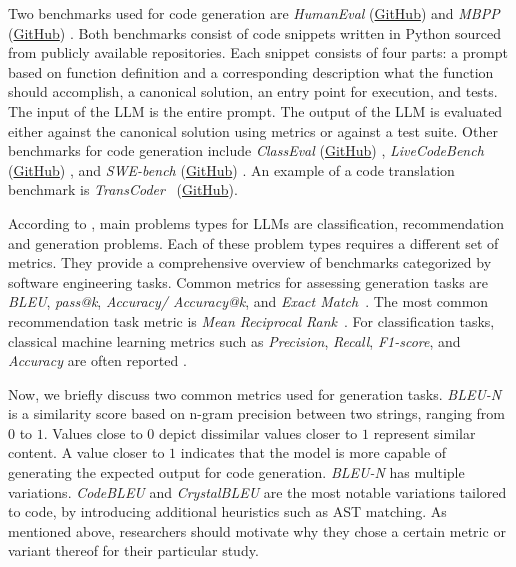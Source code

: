 Two benchmarks used for code generation are \emph{HumanEval} (\href{https://github.com/openai/human-eval}{GitHub}) \cite{DBLP:conf/acl/PapineniRWZ02} and \emph{MBPP} (\href{https://huggingface.co/datasets/google-research-datasets/mbpp}{GitHub}) \cite{DBLP:journals/corr/abs-2108-07732}.
Both benchmarks consist of code snippets written in Python sourced from publicly available repositories.
Each snippet consists of four parts: a prompt based on function definition and a corresponding description what the function should accomplish, a canonical solution, an entry point for execution, and tests.
The input of the LLM is the entire prompt.
The output of the LLM is evaluated either against the canonical solution using metrics or against a test suite.
Other benchmarks for code generation include \emph{ClassEval} (\href{https://github.com/openai/human-eval}{GitHub}) \cite{DBLP:journals/corr/abs-2308-01861}, \emph{LiveCodeBench} (\href{https://github.com/LiveCodeBench/LiveCodeBench}{GitHub}) \cite{DBLP:journals/corr/abs-2403-07974}, and \emph{SWE-bench} (\href{https://github.com/swe-bench/SWE-bench}{GitHub}) \cite{DBLP:conf/iclr/JimenezYWYPPN24}.
An example of a code translation benchmark is \emph{TransCoder}~\cite{DBLP:journals/corr/abs-2006-03511} (\href{https://github.com/facebookresearch/CodeGen}{GitHub}). 

According to \citet{10.1145/3695988}, main problems types for LLMs are classification, recommendation and generation problems.
Each of these problem types requires a different set of metrics.
They provide a comprehensive overview of benchmarks categorized by software engineering tasks.
Common metrics for assessing generation tasks are \emph{BLEU}, \emph{pass@k}, \emph{Accuracy/ Accuracy@k}, and \emph{Exact Match}~\cite{10.1145/3695988}.
The most common recommendation task metric is \emph{Mean Reciprocal Rank}~\cite{10.1145/3695988}.
For classification tasks, classical machine learning metrics such as \emph{Precision}, \emph{Recall}, \emph{F1-score}, and \emph{Accuracy} are often reported \cite{10.1145/3695988}.

Now, we briefly discuss two common metrics used for generation tasks.
\emph{BLEU-N} \cite{DBLP:conf/acl/PapineniRWZ02} is a similarity score based on n-gram precision between two strings, ranging from $0$ to $1$.
Values close to $0$ depict dissimilar values closer to $1$ represent similar content.
A value closer to $1$ indicates that the model is more capable of generating the expected output for code generation.
\emph{BLEU-N} has multiple variations.
\emph{CodeBLEU} \cite{DBLP:journals/corr/abs-2009-10297} and \emph{CrystalBLEU} \cite{DBLP:conf/kbse/EghbaliP22} are the most notable variations tailored to code, by introducing additional heuristics such as AST matching.
As mentioned above, researchers should motivate why they chose a certain metric or variant thereof for their particular study.

